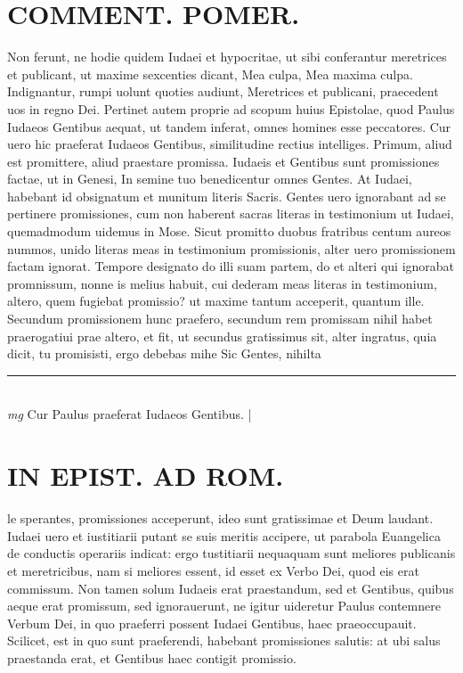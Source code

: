 \documentclass{article}
\begin{document}
\begin{pages}
\section*{COMMENT. POMER.  }\pstart Non ferunt, ne hodie quidem Iudaei et hypocritae, ut sibi conferantur meretrices et publicant, ut maxime sexcenties dicant, Mea culpa, Mea maxima culpa.  Indignantur, rumpi uolunt quoties audiunt, Meretrices et publicani, praecedent uos in regno Dei. Pertinet autem proprie ad scopum huius Epistolae, quod Paulus Iudaeos Gentibus aequat, ut tandem inferat, omnes homines esse peccatores. Cur uero hic praeferat Iudaeos Gentibus, similitudine rectius intelliges. Primum, aliud est promittere, aliud praestare promissa.  Iudaeis et Gentibus sunt promissiones factae, ut in Genesi, In semine tuo benedicentur omnes Gentes. At Iudaei, habebant id obsignatum et munitum literis Sacris. Gentes uero ignorabant ad se pertinere promissiones, cum non haberent sacras literas in testimonium ut Iudaei, quemadmodum uidemus in Mose. Sicut promitto duobus fratribus centum aureos nummos, unido literas meas in testimonium promissionis, alter uero promissionem factam ignorat. Tempore designato do illi suam partem, do et alteri qui ignorabat promnissum, nonne is melius habuit, cui dederam meas literas in testimonium, altero, quem fugiebat promissio? ut maxime tantum acceperit, quantum ille. Secundum promissionem hunc praefero, secundum rem promissam nihil habet praerogatiui prae altero, et fit, ut secundus gratissimus sit, alter ingratus, quia dicit, tu promisisti, ergo debebas mihe Sic Gentes, nihilta  \pend
\vspace{0.5cm}\noindent
\vspace{0.2cm}\rule{1cm}{0.2pt}\\ 
\hspace{0.2cm}\textit{mg}
\footnotesize Cur Paulus praeferat Iudaeos Gentibus.  
\normalsize| 
\section*{IN EPIST. AD ROM.  }
\marginpar{[ p.25 ]}\pstart le sperantes, promissiones acceperunt, ideo sunt gratissimae et Deum laudant. Iudaei uero et iustitiarii putant se suis meritis accipere, ut parabola Euangelica de conductis operariis indicat: ergo tustitiarii nequaquam sunt meliores publicanis et meretricibus, nam si meliores essent, id esset ex Verbo Dei, quod eis erat commissum. Non tamen solum Iudaeis erat praestandum, sed et Gentibus, quibus aeque erat promissum, sed ignorauerunt, ne igitur uideretur Paulus contemnere Verbum Dei, in quo praeferri possent Iudaei Gentibus, haec praeoccupauit.   \pend\pstart Scilicet, est in quo sunt praeferendi, habebant promissiones salutis: at ubi salus praestanda erat, et Gentibus haec contigit promissio.  \pend
{}
{}

\end{pages}
\end{document}
